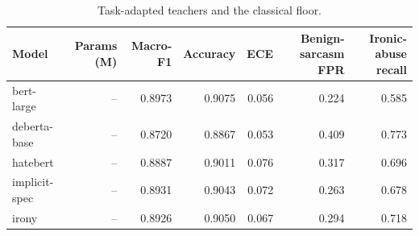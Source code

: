 \begin{table}[t]
\centering
\caption{Task-adapted teachers and the classical floor.}
\label{tab:teachers}
\begin{tabular}{lrrrrrr}
\toprule
Model & Params (M) & Macro-F1 & Accuracy & ECE & Benign-sarcasm FPR & Ironic-abuse recall \\
\midrule
bert-large & -- & 0.8973 & 0.9075 & 0.056 & 0.224 & 0.585 \\
deberta-base & -- & 0.8720 & 0.8867 & 0.053 & 0.409 & 0.773 \\
hatebert & -- & 0.8887 & 0.9011 & 0.076 & 0.317 & 0.696 \\
implicit-spec & -- & 0.8931 & 0.9043 & 0.072 & 0.263 & 0.678 \\
irony & -- & 0.8926 & 0.9050 & 0.067 & 0.294 & 0.718 \\
\bottomrule
\end{tabular}
\end{table}